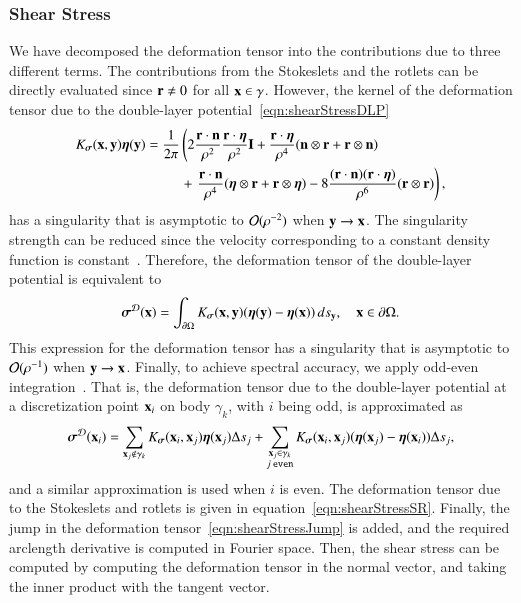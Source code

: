 \documentclass[preprint, 10pt]{elsarticle}
\begin{document}
\subsubsection{Shear Stress}
We have decomposed the deformation tensor into the contributions due to
three different terms.  The contributions from the Stokeslets and the
rotlets can be directly evaluated since ${\mathbf{r}} \neq 0$ for all ${\mathbf{x}} \in
\gamma$.  However, the kernel of the deformation tensor due to the
double-layer potential~\eqref{eqn:shearStressDLP} 
\begin{align*}
  K_{\boldsymbol\sigma}({\mathbf{x}},{\mathbf{y}}){\boldsymbol\eta}({\mathbf{y}}) &= \frac{1}{2\pi} \left(
    2\frac{{\mathbf{r}} \cdot {\mathbf{n}}}{\rho^2} \frac{{\mathbf{r}} \cdot {\boldsymbol\eta}}{\rho^2} {\mathbf{I}} + 
    \frac{{\mathbf{r}} \cdot {\boldsymbol\eta}}{\rho^4} ({\mathbf{n}} \otimes {\mathbf{r}} + {\mathbf{r}} \otimes {\mathbf{n}})
    \right. \\ & \hspace{25pt}+ \left.
    \frac{{\mathbf{r}} \cdot {\mathbf{n}}}{\rho^4} ({\boldsymbol\eta} \otimes {\mathbf{r}} + {\mathbf{r}} \otimes {\boldsymbol\eta}) - 
    8\frac{({\mathbf{r}} \cdot {\mathbf{n}})({\mathbf{r}} \cdot {\boldsymbol\eta})}{\rho^6}({\mathbf{r}} \otimes {\mathbf{r}})
  \right),
\end{align*}
has a singularity that is asymptotic to ${\mathcal{O}}(\rho^{-2})$ when ${\mathbf{y}}
\rightarrow {\mathbf{x}}$.  The singularity strength can be reduced since the
velocity corresponding to a constant density function is
constant~\cite{poz1992}.  Therefore, the deformation tensor of the
double-layer potential is equivalent to
\begin{align*}
  {\boldsymbol\sigma}^{{\mathcal{D}}}({\mathbf{x}}) = \int_{{\partial}\Omega}K_{\boldsymbol\sigma}({\mathbf{x}},{\mathbf{y}})
      ({\boldsymbol\eta}({\mathbf{y}}) - {\boldsymbol\eta}({\mathbf{x}})) \, ds_{{\mathbf{y}}}, \quad {\mathbf{x}} \in {\partial}\Omega.
\end{align*}
This expression for the deformation tensor has a singularity that is
asymptotic to ${\mathcal{O}}(\rho^{-1})$ when ${\mathbf{y}} \rightarrow {\mathbf{x}}$.  Finally,
to achieve spectral accuracy, we apply odd-even
integration~\cite{sid-isr1988}.  That is, the deformation tensor due to
the double-layer potential at a discretization point ${\mathbf{x}}_i$ on body
$\gamma_k$, with $i$ being odd, is approximated as
\begin{align}
  {\boldsymbol\sigma}^{{\mathcal{D}}}({\mathbf{x}}_i) = \sum_{{\mathbf{x}}_j \notin \gamma_k}
    K_{\boldsymbol\sigma}({\mathbf{x}}_i,{\mathbf{x}}_j) {\boldsymbol\eta}({\mathbf{x}}_j) \Delta s_j + 
  \sum_{\substack{{\mathbf{x}}_j \in \gamma_k \\ j \: \mathtt{even}}}
    K_{\boldsymbol\sigma}({\mathbf{x}}_i,{\mathbf{x}}_j) ({\boldsymbol\eta}({\mathbf{x}}_j) - {\boldsymbol\eta}({\mathbf{x}}_i)) \Delta s_j,
  \label{eqn:stressOddEven}
\end{align}
and a similar approximation is used when $i$ is even.  The deformation
tensor due to the Stokeslets and rotlets is given in
equation~\eqref{eqn:shearStressSR}.  Finally, the jump in the
deformation tensor~\eqref{eqn:shearStressJump} is added, and the
required arclength derivative is computed in Fourier space.  Then, the
shear stress can be computed by computing the deformation tensor in the
normal vector, and taking the inner product with the tangent vector.
\end{document}
